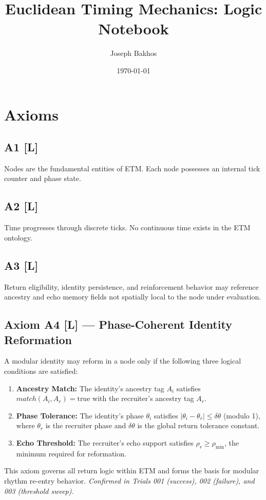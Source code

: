 \documentclass[12pt]{article}
\title{Euclidean Timing Mechanics: Logic Notebook}
\author{Joseph Bakhos}
\date{\today}
\begin{document}
\maketitle

\tableofcontents
\newpage

\section{Axioms}

\subsection*{A1 [L]}
Nodes are the fundamental entities of ETM. Each node possesses an internal tick counter and phase state.

\subsection*{A2 [L]}
Time progresses through discrete ticks. No continuous time exists in the ETM ontology.

\subsection*{A3 [L]}
Return eligibility, identity persistence, and reinforcement behavior may reference ancestry and echo memory fields not spatially local to the node under evaluation.

\subsection*{Axiom A4 [L] — Phase-Coherent Identity Reformation}
A modular identity may reform in a node only if the following three logical conditions are satisfied:
\begin{enumerate}
  \item \textbf{Ancestry Match:} The identity's ancestry tag $A_i$ satisfies $match(A_i, A_r) = \text{true}$ with the recruiter's ancestry tag $A_r$.
  \item \textbf{Phase Tolerance:} The identity's phase $\theta_i$ satisfies $|\theta_i - \theta_r| \le \delta\theta$ (modulo 1), where $\theta_r$ is the recruiter phase and $\delta\theta$ is the global return tolerance constant.
  \item \textbf{Echo Threshold:} The recruiter’s echo support satisfies $\rho_r \ge \rho_{\text{min}}$, the minimum required for reformation.
\end{enumerate}
This axiom governs all return logic within ETM and forms the basis for modular rhythm re-entry behavior.
\textit{Confirmed in Trials 001 (success), 002 (failure), and 003 (threshold sweep).}
\end{document}
